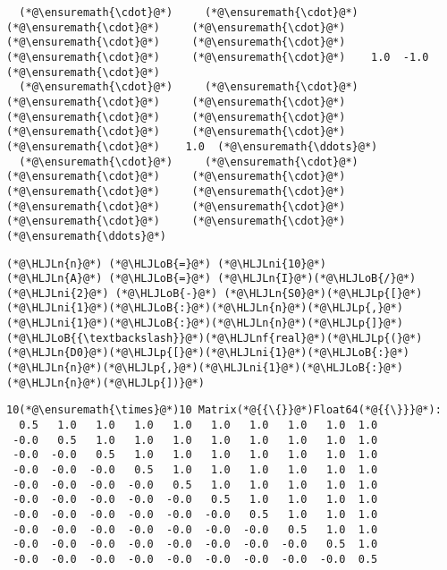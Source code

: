\documentclass[12pt,a4paper]{article}
\newcommand{\HLJLn}[1]{#1}
\newcommand{\HLJLnf}[1]{\textcolor[RGB]{66,102,213}{#1}}
\newcommand{\HLJLni}[1]{\textcolor[RGB]{59,151,46}{#1}}
\newcommand{\HLJLoB}[1]{\textcolor[RGB]{102,102,102}{\textbf{#1}}}
\newcommand{\HLJLp}[1]{#1}
\begin{document}
\begin{lstlisting}
  (*@\ensuremath{\cdot}@*)     (*@\ensuremath{\cdot}@*)     (*@\ensuremath{\cdot}@*)     (*@\ensuremath{\cdot}@*)     (*@\ensuremath{\cdot}@*)     (*@\ensuremath{\cdot}@*)     (*@\ensuremath{\cdot}@*)     (*@\ensuremath{\cdot}@*)    1.0  -1.0  (*@\ensuremath{\cdot}@*)
  (*@\ensuremath{\cdot}@*)     (*@\ensuremath{\cdot}@*)     (*@\ensuremath{\cdot}@*)     (*@\ensuremath{\cdot}@*)     (*@\ensuremath{\cdot}@*)     (*@\ensuremath{\cdot}@*)     (*@\ensuremath{\cdot}@*)     (*@\ensuremath{\cdot}@*)     (*@\ensuremath{\cdot}@*)    1.0  (*@\ensuremath{\ddots}@*)
  (*@\ensuremath{\cdot}@*)     (*@\ensuremath{\cdot}@*)     (*@\ensuremath{\cdot}@*)     (*@\ensuremath{\cdot}@*)     (*@\ensuremath{\cdot}@*)     (*@\ensuremath{\cdot}@*)     (*@\ensuremath{\cdot}@*)     (*@\ensuremath{\cdot}@*)     (*@\ensuremath{\cdot}@*)     (*@\ensuremath{\cdot}@*)   (*@\ensuremath{\ddots}@*)
\end{lstlisting}


\begin{lstlisting}
(*@\HLJLn{n}@*) (*@\HLJLoB{=}@*) (*@\HLJLni{10}@*)
(*@\HLJLn{A}@*) (*@\HLJLoB{=}@*) (*@\HLJLn{I}@*)(*@\HLJLoB{/}@*)(*@\HLJLni{2}@*) (*@\HLJLoB{-}@*) (*@\HLJLn{S0}@*)(*@\HLJLp{[}@*)(*@\HLJLni{1}@*)(*@\HLJLoB{:}@*)(*@\HLJLn{n}@*)(*@\HLJLp{,}@*)(*@\HLJLni{1}@*)(*@\HLJLoB{:}@*)(*@\HLJLn{n}@*)(*@\HLJLp{]}@*)(*@\HLJLoB{{\textbackslash}}@*)(*@\HLJLnf{real}@*)(*@\HLJLp{(}@*)(*@\HLJLn{D0}@*)(*@\HLJLp{[}@*)(*@\HLJLni{1}@*)(*@\HLJLoB{:}@*)(*@\HLJLn{n}@*)(*@\HLJLp{,}@*)(*@\HLJLni{1}@*)(*@\HLJLoB{:}@*)(*@\HLJLn{n}@*)(*@\HLJLp{])}@*)
\end{lstlisting}

\begin{lstlisting}
10(*@\ensuremath{\times}@*)10 Matrix(*@{{\{}}@*)Float64(*@{{\}}}@*):
  0.5   1.0   1.0   1.0   1.0   1.0   1.0   1.0   1.0  1.0
 -0.0   0.5   1.0   1.0   1.0   1.0   1.0   1.0   1.0  1.0
 -0.0  -0.0   0.5   1.0   1.0   1.0   1.0   1.0   1.0  1.0
 -0.0  -0.0  -0.0   0.5   1.0   1.0   1.0   1.0   1.0  1.0
 -0.0  -0.0  -0.0  -0.0   0.5   1.0   1.0   1.0   1.0  1.0
 -0.0  -0.0  -0.0  -0.0  -0.0   0.5   1.0   1.0   1.0  1.0
 -0.0  -0.0  -0.0  -0.0  -0.0  -0.0   0.5   1.0   1.0  1.0
 -0.0  -0.0  -0.0  -0.0  -0.0  -0.0  -0.0   0.5   1.0  1.0
 -0.0  -0.0  -0.0  -0.0  -0.0  -0.0  -0.0  -0.0   0.5  1.0
 -0.0  -0.0  -0.0  -0.0  -0.0  -0.0  -0.0  -0.0  -0.0  0.5
\end{lstlisting}
\end{document}
